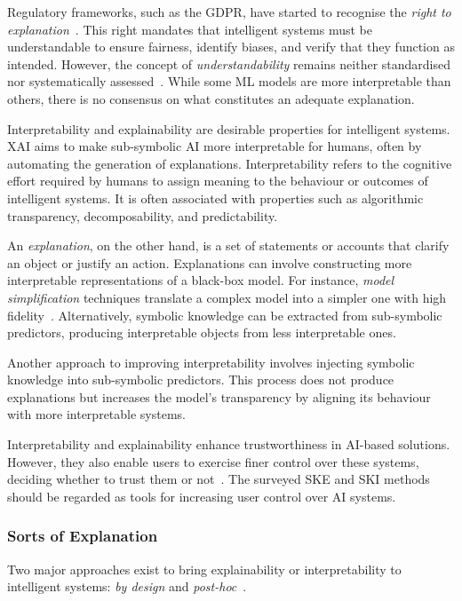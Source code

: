 Regulatory frameworks, such as the \gls{GDPR}, have started to recognise the \emph{right to explanation}~\cite{DBLP:journals/aim/GoodmanF17}.
%
This right mandates that intelligent systems must be understandable to ensure fairness, identify biases, and verify that they function as intended.
%
However, the concept of \emph{understandability} remains neither standardised nor systematically assessed~\cite{DBLP:journals/ai/Miller19}.
%
While some \gls{ML} models are more interpretable than others, there is no consensus on what constitutes an adequate explanation.


Interpretability and explainability are desirable properties for intelligent systems.
%
\Gls{XAI} aims to make sub-symbolic \gls{AI} more interpretable for humans, often by automating the generation of explanations.
%
Interpretability refers to the cognitive effort required by humans to assign meaning to the behaviour or outcomes of intelligent systems.
%
It is often associated with properties such as algorithmic transparency, decomposability, and predictability.


An \emph{explanation}, on the other hand, is a set of statements or accounts that clarify an object or justify an action.
%
Explanations can involve constructing more interpretable representations of a black-box model.
%
For instance, \emph{model simplification} techniques translate a complex model into a simpler one with high fidelity~\cite{DBLP:conf/kdd/TolomeiSHL17,DBLP:journals/csur/GuidottiMRTGP19}.
%
Alternatively, symbolic knowledge can be extracted from sub-symbolic predictors, producing interpretable objects from less interpretable ones.


Another approach to improving interpretability involves injecting symbolic knowledge into sub-symbolic predictors.
%
This process does not produce explanations but increases the model's transparency by aligning its behaviour with more interpretable systems.

Interpretability and explainability enhance trustworthiness in \gls{AI}-based solutions.
%
However, they also enable users to exercise finer control over these systems, deciding whether to trust them or not~\cite{10.1214/21-SS133}.
%
The surveyed \gls{SKE} and \gls{SKI} methods should be regarded as tools for increasing user control over \gls{AI} systems.


\subsubsection{Sorts of Explanation}\label{subsubsec:sorts-of-explanation}
%
Two major approaches exist to bring explainability or interpretability to intelligent systems: \emph{by design} and \emph{post-hoc}~\cite{DBLP:conf/atal/CiattoSOC20,DBLP:journals/inffus/ArrietaRSBTBGGM20,DBLP:journals/csur/GuidottiMRTGP19}.


